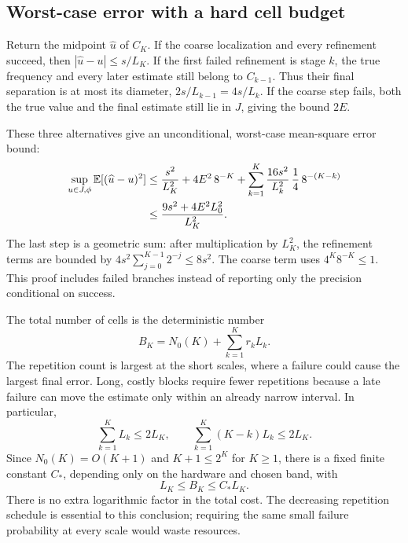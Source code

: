 \documentclass[11pt,a4paper]{article}
\numberwithin{equation}{section}
\theoremstyle{remark}
\begin{document}
\subsection{Worst-case error with a hard cell budget}
\label{phase:riskcost}

Return the midpoint $\widehat u$ of $C_K$.  If the coarse localization and
every refinement succeed, then
$|\widehat u-u|\le s/L_K$.  If the first failed refinement is stage $k$,
the true frequency and every later estimate still belong to $C_{k-1}$.
Thus their final separation is at most its diameter,
$2s/L_{k-1}=4s/L_k$.  If the coarse step fails, both the true value and the
final estimate still lie in $J$, giving the bound $2E$.

These three alternatives give an unconditional, worst-case mean-square
error bound:
\begin{align}
 \sup_{u\in J,\phi}\mathbb E[(\widehat u-u)^2]
 &\le\frac{s^2}{L_K^2}+4E^2\,8^{-K}
 +\sum_{k=1}^{K}\frac{16s^2}{L_k^2}\,
                   \frac14\,8^{-(K-k)}\notag\\
 &\le\frac{9s^2+4E^2L_0^2}{L_K^2}.
 \label{phase:globalrisk}
\end{align}
The last step is a geometric sum: after multiplication by $L_K^2$, the
refinement terms are bounded by
$4s^2\sum_{j=0}^{K-1}2^{-j}\le8s^2$.  The coarse term uses
$4^K8^{-K}\le1$.  This proof includes failed branches instead of reporting
only the precision conditional on success.

The total number of cells is the deterministic number
\begin{equation}
 B_K=N_0(K)+\sum_{k=1}^{K}r_kL_k.
 \label{phase:budget}
\end{equation}
The repetition count is largest at the short scales, where a failure could
cause the largest final error.  Long, costly blocks require fewer
repetitions because a late failure can move the estimate only within an
already narrow interval.  In particular,
\begin{equation}
 \sum_{k=1}^{K}L_k\le2L_K,
 \qquad
 \sum_{k=1}^{K}(K-k)L_k\le2L_K.
 \label{phase:costsums}
\end{equation}
Since $N_0(K)=O(K+1)$ and $K+1\le2^K$ for $K\ge1$, there is a fixed
finite constant $C_*$, depending only on the hardware and chosen band, with
\begin{equation}
 L_K\le B_K\le C_*L_K.
 \label{phase:linearcost}
\end{equation}
There is no extra logarithmic factor in the total cost.  The decreasing
repetition schedule is essential to this conclusion; requiring the same
small failure probability at every scale would waste resources.
\end{document}
